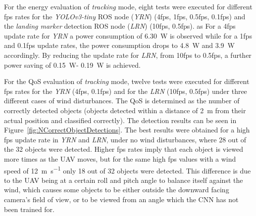 \documentclass[conference]{IEEEtran}
\begin{document}
For the energy 
evaluation of \emph{tracking} mode, eight tests were executed for different fps rates 
for the \emph{YOLOv3-tiny} ROS node (\emph{YRN}) (4fps, 1fps, 0.5fps, 0.1fps) and 
the \emph{landing marker} detection ROS node (\emph{LRN}) (10fps, 0.5fps). as 
%
For a 4fps update rate
for \emph{YRN}
a power consumption of \SI{6.30}{\watt} is observed while
for a 1fps and 0.1fps update rates, the power consumption drops to
\SI{4,8}{\watt} and \SI{3.9}{\watt} accordingly. By reducing the update rate for \emph{LRN},
from 10fps to 0.5fps, a further power
saving of \SI{0.15}{\watt}- \SI{0.19}{\watt} is achieved.



For the QoS evaluation of \emph{tracking} mode, twelve tests were executed for different 
fps rates for the \emph{YRN}
 (4fps, 0.1fps) and for 
the \emph{LRN}
 (10fps, 0.5fps) under 
three different cases of wind disturbances. 
%
The QoS is determined as the number of correctly detected objects (objects detected within a distance of \SI{2}{\meter} from their actual position and classified correctly). 
%
The detection results can be seen in
Figure~\ref{fig:NCorrectObjectDetections}. The best results were
obtained for a high fps update rate in \emph{YRN} %
 and \emph{LRN},
under no wind disturbances, where 28 out of the 32
objects were detected. %
Higher fps rates imply that each object is viewed more times as the UAV moves, but %
for the same high fps values with a wind speed of \SI{12}{\meter \per \second} only 18 out of 32 objects were detected. This difference is due to the UAV %
being at a certain roll and pitch angle to balance itself against the wind, which causes some objects to be either outside the downward facing camera's field of view, or to be viewed from an angle which the CNN has not been trained for.
\end{document}
